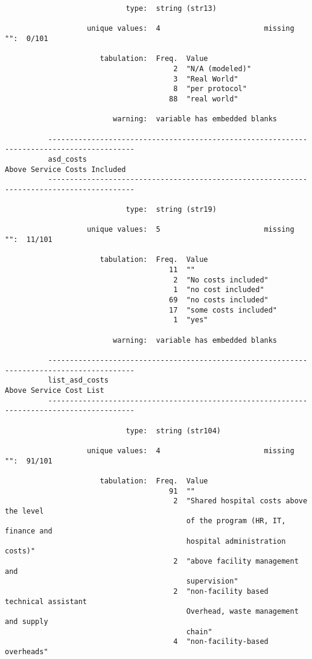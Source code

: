 \documentclass{article}
\begin{document}
\begin{verbatim}
                            type:  string (str13)
          
                   unique values:  4                        missing "":  0/101
          
                      tabulation:  Freq.  Value
                                       2  "N/A (modeled)"
                                       3  "Real World"
                                       8  "per protocol"
                                      88  "real world"
          
                         warning:  variable has embedded blanks
          
          ------------------------------------------------------------------------------------------
          asd_costs                                                     Above Service Costs Included
          ------------------------------------------------------------------------------------------
          
                            type:  string (str19)
          
                   unique values:  5                        missing "":  11/101
          
                      tabulation:  Freq.  Value
                                      11  ""
                                       2  "No costs included"
                                       1  "no cost included"
                                      69  "no costs included"
                                      17  "some costs included"
                                       1  "yes"
          
                         warning:  variable has embedded blanks
          
          ------------------------------------------------------------------------------------------
          list_asd_costs                                                     Above Service Cost List
          ------------------------------------------------------------------------------------------
          
                            type:  string (str104)
          
                   unique values:  4                        missing "":  91/101
          
                      tabulation:  Freq.  Value
                                      91  ""
                                       2  "Shared hospital costs above the level
                                          of the program (HR, IT, finance and
                                          hospital administration costs)"
                                       2  "above facility management and
                                          supervision"
                                       2  "non-facility based technical assistant
                                          Overhead, waste management and supply
                                          chain"
                                       4  "non-facility-based overheads"
          

\end{verbatim}
\end{document}
